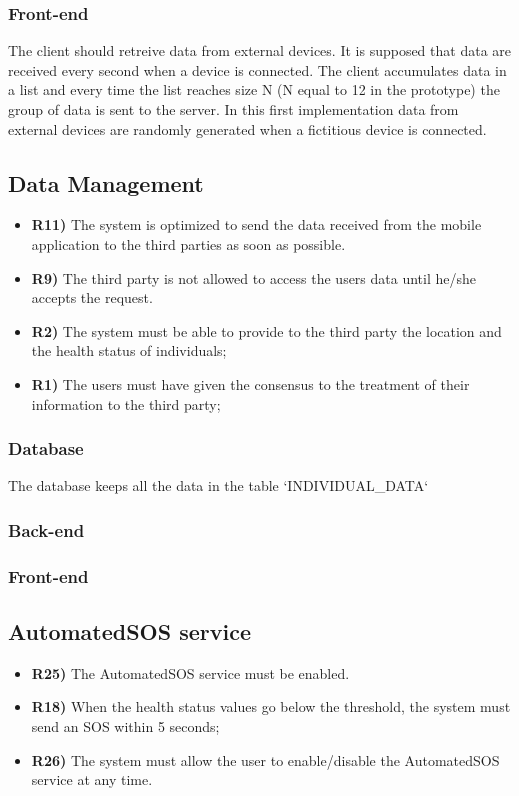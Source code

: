 \subsubsection*{Front-end}
The client should retreive data from external devices. It is supposed that data are received every second when a device is connected. The client accumulates data in a list and every time the list reaches size N (N equal to 12 in the prototype) the group of data is sent to the server.
In this first implementation data from external devices are randomly generated when a fictitious device is connected.


\subsection{Data Management}
\begin{itemize}	
	\item {\color{Green}\textbf{R11)}} The system is optimized to send the data received from the mobile application to the third parties as soon as possible.
	\item {\color{Green}\textbf{R9)}} The third party is not allowed to access the users data until he/she accepts the request.
	\item {\color{Green}\textbf{R2)}} The system must be able to provide to the third party the location and the health status of individuals;
	\item {\color{Green}\textbf{R1)}} The users must have given the consensus to the treatment of their information to the third party;
\end{itemize}

\subsubsection*{Database}
The database keeps all the data in the table `INDIVIDUAL\_DATA`


\subsubsection*{Back-end}


\subsubsection*{Front-end}


\subsection{AutomatedSOS service}
\begin{itemize}	
	\item {\color{Green}\textbf{R25)}} The AutomatedSOS service must be enabled.
	\item {\color{Green}\textbf{R18)}} When the health status values go below the threshold, the system must send an SOS within 5 seconds;
	\item {\color{Green}\textbf{R26)}}	 The system must allow the user to enable/disable the AutomatedSOS service at any time.
\end{itemize}

